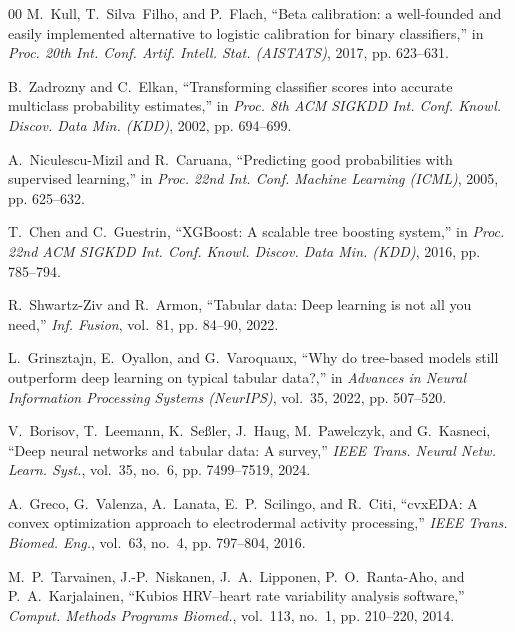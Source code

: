 \documentclass[conference]{IEEEtran}
\begin{document}
\begin{thebibliography}{00}
M.~Kull, T.~Silva~Filho, and P.~Flach, ``Beta calibration: a well-founded and easily implemented alternative to logistic calibration for binary classifiers,'' in \textit{Proc. 20th Int. Conf. Artif. Intell. Stat. (AISTATS)}, 2017, pp. 623--631.

B.~Zadrozny and C.~Elkan, ``Transforming classifier scores into accurate multiclass probability estimates,'' in \textit{Proc. 8th ACM SIGKDD Int. Conf. Knowl. Discov. Data Min. (KDD)}, 2002, pp. 694--699.

A.~Niculescu-Mizil and R.~Caruana, ``Predicting good probabilities with supervised learning,'' in \textit{Proc. 22nd Int. Conf. Machine Learning (ICML)}, 2005, pp. 625--632.

T.~Chen and C.~Guestrin, ``XGBoost: A scalable tree boosting system,'' in \textit{Proc. 22nd ACM SIGKDD Int. Conf. Knowl. Discov. Data Min. (KDD)}, 2016, pp. 785--794.

R.~Shwartz-Ziv and R.~Armon, ``Tabular data: Deep learning is not all you need,'' \textit{Inf. Fusion}, vol.~81, pp. 84--90, 2022.

L.~Grinsztajn, E.~Oyallon, and G.~Varoquaux, ``Why do tree-based models still outperform deep learning on typical tabular data?,'' in \textit{Advances in Neural Information Processing Systems (NeurIPS)}, vol.~35, 2022, pp. 507--520.

V.~Borisov, T.~Leemann, K.~Se\ss{}ler, J.~Haug, M.~Pawelczyk, and G.~Kasneci, ``Deep neural networks and tabular data: A survey,'' \textit{IEEE Trans. Neural Netw. Learn. Syst.}, vol.~35, no.~6, pp. 7499--7519, 2024.

A.~Greco, G.~Valenza, A.~Lanata, E.~P.~Scilingo, and R.~Citi, ``cvxEDA: A convex optimization approach to electrodermal activity processing,'' \textit{IEEE Trans. Biomed. Eng.}, vol.~63, no.~4, pp. 797--804, 2016.

M.~P.~Tarvainen, J.-P.~Niskanen, J.~A.~Lipponen, P.~O.~Ranta-Aho, and P.~A.~Karjalainen, ``Kubios HRV--heart rate variability analysis software,'' \textit{Comput. Methods Programs Biomed.}, vol.~113, no.~1, pp. 210--220, 2014.
\end{thebibliography}
\end{document}
